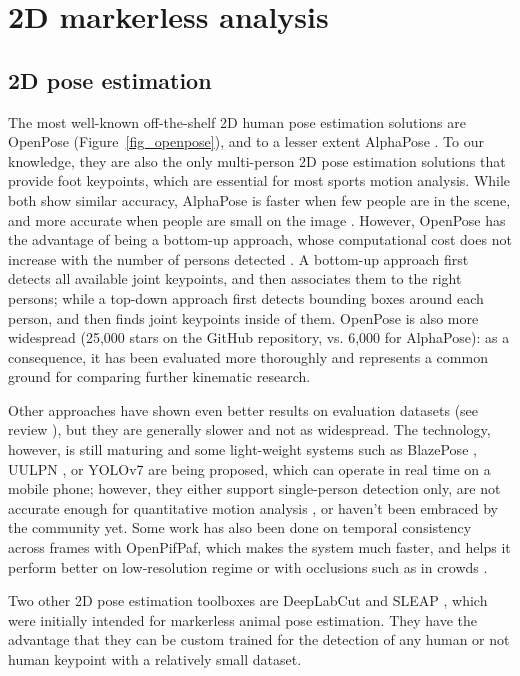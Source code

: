 \FloatBarrier
\section{2D markerless analysis}
\subsection{2D pose estimation}

The most well-known off-the-shelf 2D human pose estimation solutions are OpenPose \cite{Cao2019} (Figure~\ref{fig_openpose}), and to a lesser extent AlphaPose \cite{Fang2017}. To our knowledge, they are also the only multi-person 2D pose estimation solutions that provide foot keypoints, which are essential for most sports motion analysis. While both show similar accuracy, AlphaPose is faster when few people are in the scene, and more accurate when people are small on the image \cite{Hidalgo2019}. However, OpenPose has the advantage of being a bottom-up approach, whose computational cost does not increase with the number of persons detected \cite{Cao2019}. A bottom-up approach first detects all available joint keypoints, and then associates them to the right persons; while a top-down approach first detects bounding boxes around each person, and then finds joint keypoints inside of them. OpenPose is also more widespread (25,000 stars on the GitHub repository, vs. 6,000 for AlphaPose): as a consequence, it has been evaluated more thoroughly and represents a common ground for comparing further kinematic research. 

Other approaches have shown even better results on evaluation datasets (see review \cite{Chen2020}), but they are generally slower and not as widespread. The technology, however, is still maturing and some light-weight systems such as BlazePose \cite{Bazarevsky2020}, UULPN \cite{Wang2022a}, or YOLOv7 \cite{Wang2022b} are being proposed, which can operate in real time on a mobile phone; however, they either support single-person detection only, are not accurate enough for quantitative motion analysis \cite{Mroz2021}, or haven't been embraced by the community yet. Some work has also been done on temporal consistency across frames with OpenPifPaf, which makes the system much faster, and helps it perform better on low-resolution regime or with occlusions such as in crowds \cite{Kreiss2021}.

Two other 2D pose estimation toolboxes are DeepLabCut \cite{Mathis2018,Lauer2022} and SLEAP \cite{Pereira2022}, which were initially intended for markerless animal pose estimation. They have the advantage that they can be custom trained for the detection of any human or not human keypoint with a relatively small dataset. 


